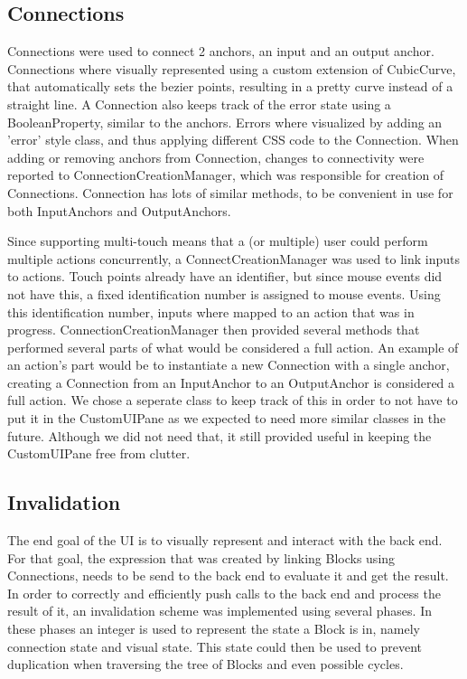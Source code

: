 \subsection{Connections}
Connections were used to connect 2 anchors, an input and an output anchor. Connections where visually represented using a custom extension of CubicCurve, that automatically sets the bezier points, resulting in a pretty curve instead of a straight line. A Connection also keeps track of the error state using a BooleanProperty, similar to the anchors. Errors where visualized by adding an 'error' style class, and thus applying different CSS code to the Connection. When adding or removing anchors from Connection, changes to connectivity were reported to ConnectionCreationManager, which was responsible for creation of Connections. Connection has lots of similar methods, to be convenient in use for both InputAnchors and OutputAnchors.

Since supporting multi-touch means that a (or multiple) user could perform multiple actions concurrently, a ConnectCreationManager was used to link inputs to actions. Touch points already have an identifier, but since mouse events did not have this, a fixed identification number is assigned to mouse events. Using this identification number, inputs where mapped to an action that was in progress. ConnectionCreationManager then provided several methods that performed several parts of what would be considered a full action. An example of an action's part would be to instantiate a new Connection with a single anchor, creating a Connection from an InputAnchor to an OutputAnchor is considered a full action. We chose a seperate class to keep track of this in order to not have to put it in the CustomUIPane as we expected to need more similar classes in the future. Although we did not need that, it still provided useful in keeping the CustomUIPane free from clutter.

\subsection{Invalidation}
The end goal of the UI is to visually represent and interact with the back end. For that goal, the expression that was created by linking Blocks using Connections, needs to be send to the back end to evaluate it and get the result. In order to correctly and efficiently push calls to the back end and process the result of it, an invalidation scheme was implemented using several phases. In these phases an integer is used to represent the state a Block is in, namely connection state and visual state. This state could then be used to prevent duplication when traversing the tree of Blocks and even possible cycles.

